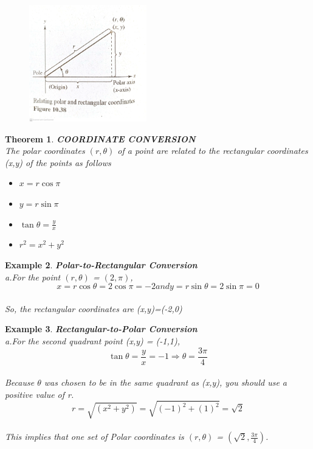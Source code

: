 \documentclass[12pt,twoside]{article}
\newtheorem{theorem}{\bf Theorem}[section]
\newtheorem{example}[theorem]{\bf Example}
\begin{document}
\begin{figure}[h]
\centering
\includegraphics[height=2in]{Figure 10.38.jpg}
\end{figure}

\begin{theorem}
\textbf{COORDINATE CONVERSION} 
\\The polar coordinates $(r, \theta)$ of a point are related to the rectangular coordinates \emph{(x,y)} of the points as follows
\end{theorem}

\begin{itemize}
\item $x = r\cos\pi$     
\item $y = r\sin\pi$
\item $\tan \theta = \frac{y}{x}$
\item $r^2 = x^2 + y^2$
\end{itemize}

\begin{example}\rm
\textbf{Polar-to-Rectangular Conversion}
\\a.For the point $(r,\theta)$ = $(2,\pi)$,
$$
{x} = r\cos\theta=2\cos\pi=-2 and y=r\sin\theta=2\sin\pi=0
$$
\\So, the rectangular coordinates are (x,y)=(-2,0)
\end{example}

\begin{example}\rm
\textbf{Rectangular-to-Polar Conversion}
\\a.For the second quadrant point (x,y) = (-1,1),
$$
\tan\theta = \frac{y}{x} = -1 \Rightarrow\theta = \frac{3\pi}{4}
$$
\\Because $\theta$ was chosen to be in the same quadrant as (x,y), you should use a positive value of r.
$$
r=\sqrt{(x^2 + y^2)} = \sqrt{(-1)^2 +(1)^2} = \sqrt{2}
$$
\\This implies that \emph{one} set of Polar coordinates is $(r,\theta)$ = $(\sqrt{2},\frac{3\pi}{4})$.
\end{example}
\end{document}
